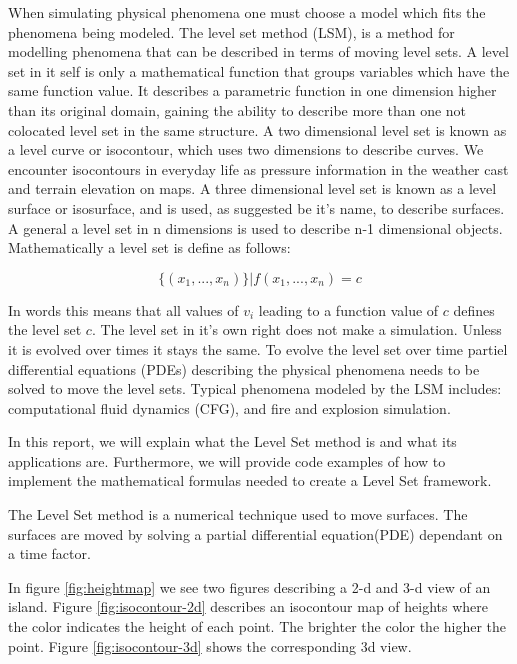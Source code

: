 When simulating physical phenomena one must choose a model which fits
the phenomena being modeled. The level set method (LSM), is a method
for modelling phenomena that can be described in terms of moving level
sets.
%
A level set in it self is only a mathematical function that groups
variables which have the same function value. It describes a
parametric function in one dimension higher than its original domain,
gaining the ability to describe more than one not colocated level set
in the same structure.
%
A two dimensional level set is known as a level curve or isocontour,
which uses two dimensions to describe curves. We encounter isocontours
in everyday life as pressure information in the weather cast and
terrain elevation on maps.
%
A three dimensional level set is
known as a level surface or isosurface, and is used, as suggested be
it's name, to describe surfaces.  A general a level set in n
dimensions is used to describe n-1 dimensional objects. Mathematically
a level set is define as follows:

\begin{equation}
\{ (x_1,...,x_n) \} | f(x_1,...,x_n) = c
\end{equation}

In words this means that all values of $v_i$ leading to a function
value of $c$ defines the level set $c$.
%
The level set in it's own right does not make a simulation. Unless it
is evolved over times it stays the same. To evolve the level set over
time partiel differential equations (PDEs) describing the physical
phenomena needs to be solved to move the level sets.
%
Typical phenomena modeled by the LSM includes: computational fluid
dynamics (CFG), and fire and explosion simulation. 

In this report, we will explain what the Level Set method is and what
its applications are. Furthermore, we will provide code examples of
how to implement the mathematical formulas needed to create a Level
Set framework.

The Level Set method is a numerical technique used to move
surfaces. The surfaces are moved by solving a partial differential
equation(PDE) dependant on a time factor.

In figure \vref{fig:heightmap} we see two figures describing a 2-d and
3-d view of an island. Figure \vref{fig:isocontour-2d} describes an
isocontour map of heights where the color indicates the height of each
point. The brighter the color the higher the point. Figure
\vref{fig:isocontour-3d} shows the corresponding 3d view.

